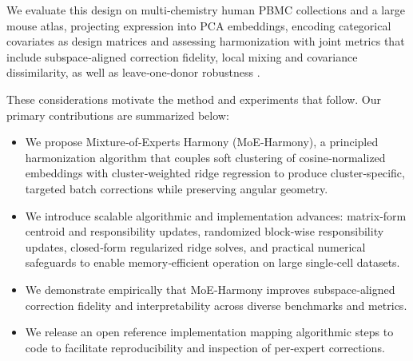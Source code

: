 \documentclass{article}
\begin{document}
We evaluate this design on multi‑chemistry human PBMC collections and a large mouse atlas, projecting expression into PCA embeddings, encoding categorical covariates as design matrices and assessing harmonization with joint metrics that include subspace‑aligned correction fidelity, local mixing and covariance dissimilarity, as well as leave‑one‑donor robustness \citep{Zheng2016MassivelyPD,Arazi2019TheIC,PijuanSala2019ASM,Manno2018RNAVO,Segerstolpe2016SingleCellTP,Ritchie2015limmaPD}.

These considerations motivate the method and experiments that follow. Our primary contributions are summarized below:

\begin{itemize}
\item We propose Mixture‑of‑Experts Harmony (MoE‑Harmony), a principled harmonization algorithm that couples soft clustering of cosine‑normalized embeddings with cluster‑weighted ridge regression to produce cluster‑specific, targeted batch corrections while preserving angular geometry.
\item We introduce scalable algorithmic and implementation advances: matrix‑form centroid and responsibility updates, randomized block‑wise responsibility updates, closed‑form regularized ridge solves, and practical numerical safeguards to enable memory‑efficient operation on large single‑cell datasets.
\item We demonstrate empirically that MoE‑Harmony improves subspace‑aligned correction fidelity and interpretability across diverse benchmarks and metrics.
\item We release an open reference implementation mapping algorithmic steps to code to facilitate reproducibility and inspection of per‑expert corrections.
\end{itemize}



\end{document}
